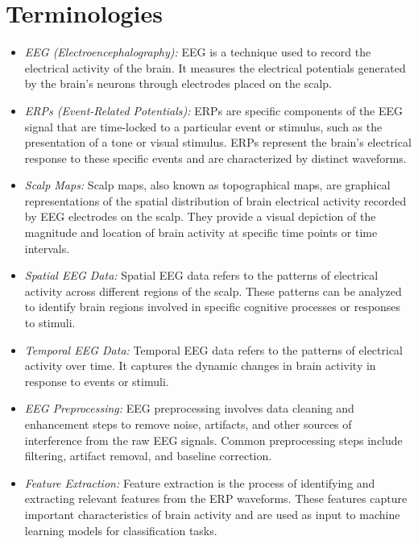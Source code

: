 \documentclass{article}
\begin{document}
\section{Terminologies}

\begin{itemize}
  \item \textit{EEG (Electroencephalography):} EEG is a technique used to record the electrical activity of the brain. It measures the electrical potentials generated by the brain's neurons through electrodes placed on the scalp.
  
  \item \textit{ERPs (Event-Related Potentials):} ERPs are specific components of the EEG signal that are time-locked to a particular event or stimulus, such as the presentation of a tone or visual stimulus. ERPs represent the brain's electrical response to these specific events and are characterized by distinct waveforms.
  
  \item \textit{Scalp Maps:} Scalp maps, also known as topographical maps, are graphical representations of the spatial distribution of brain electrical activity recorded by EEG electrodes on the scalp. They provide a visual depiction of the magnitude and location of brain activity at specific time points or time intervals.
  
  \item \textit{Spatial EEG Data:} Spatial EEG data refers to the patterns of electrical activity across different regions of the scalp. These patterns can be analyzed to identify brain regions involved in specific cognitive processes or responses to stimuli.
  
  \item \textit{Temporal EEG Data:} Temporal EEG data refers to the patterns of electrical activity over time. It captures the dynamic changes in brain activity in response to events or stimuli.
  
  \item \textit{EEG Preprocessing:} EEG preprocessing involves data cleaning and enhancement steps to remove noise, artifacts, and other sources of interference from the raw EEG signals. Common preprocessing steps include filtering, artifact removal, and baseline correction.
  
  \item \textit{Feature Extraction:} Feature extraction is the process of identifying and extracting relevant features from the ERP waveforms. These features capture important characteristics of brain activity and are used as input to machine learning models for classification tasks.
\end{itemize}
\end{document}
